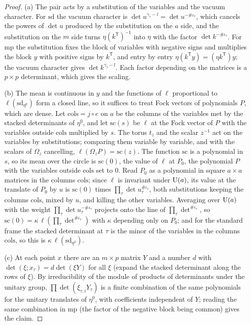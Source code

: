 \begin{proof}
(a) The pair acts by a substitution of the variables and the vacuum character. For $\mathrm{sd}$ the vacuum character is $\det u^{\gamma_\tau-l}=\det u^{-\#\iota_\tau}$, which cancels the powers of $\det u$ produced by the
substitution on the $a$ side, and the substitution on the $m$ side turns $\eta(k^{\mathsf T})^{-1}$ into $\eta$ with the factor $\det k^{-\#\iota_\tau}$. For $\mathrm{mp}$ the substitution fixes the block of variables with
negative signs and multiplies the block $y$ with positive signs by $k^{\mathsf T}$, and entry by entry $\eta(k^{\mathsf T}y)=(\eta k^{\mathsf T})y$; the vacuum character gives $\det k^{\gamma_\tau-l}$. Each factor depending on
the matrices is a $p\times p$ determinant, which gives the scaling.

(b) The mean is continuous in $y$ and the functions of $\ell$ proportional to $\ell(\mathrm{sd}_{\eta^0})$ form a closed line, so it suffices to treat Fock vectors of polynomials $P$, which are dense. Let
$\mathrm{cols}=j\circ e$ on $a$ be the columns of the variables met by the stacked determinants of $\eta^0$, and let $\mathrm{sc}(s)$ be $\ell$ at the Fock vector of $P$ with the variables outside $\mathrm{cols}$ multiplied by
$s$. The torus $t_z$ and the scalar $z^{-1}$ act on the variables by substitutions; comparing them variable by variable, and with the scalars of $\Omega_z$ cancelling, $\ell(\Omega_zP)=\mathrm{sc}(z)$. The function $\mathrm{sc}$
is a polynomial in $s$, so its mean over the circle is $\mathrm{sc}(0)$, the value of $\ell$ at $P_0$, the polynomial $P$ with the variables outside $\mathrm{cols}$ set to $0$. Read $P_0$ as a polynomial in square
$a\times a$ matrices in the columns $\mathrm{cols}$; since $\ell$ is invariant under $\operatorname{U}(a)$, its value at the translate of $P_0$ by $u$ is $\mathrm{sc}(0)$ times $\prod_\tau\det u_\tau^{\#\iota_\tau}$, both substitutions keeping the
columns $\mathrm{cols}$, mixed by $u$, and killing the other variables. Averaging over $\operatorname{U}(a)$ with the weight $\prod_\tau\det u_\tau^{-\#\iota_\tau}$ projects onto the line of $\prod_\tau\det^{\#\iota_\tau}$, so
$\mathrm{sc}(0)=\kappa\,\ell(\prod_\tau\det^{\#\iota_\tau})$ with $\kappa$ depending only on $P_0$; and for the standard frame the stacked determinant at $\tau$ is the minor of the variables in the columns $\mathrm{cols}$, so this is
$\kappa\,\ell(\mathrm{sd}_{\eta^0})$.

(c) At each point $x$ there are an $m\times p$ matrix $Y$ and a number $d$ with $\det(\xi;x_\tau)=d\det(\xi Y)$ for all $\xi$ (expand the stacked determinant along the rows of $\xi$). By irreducibility of the module of
products of determinants under the unitary group, $\prod\det(\xi_{\tau,i}Y_\tau)$ is a finite combination of the same polynomials for the unitary translates of $\eta^0$, with coefficients independent of $Y$; reading
the same combination in $\mathrm{mp}$ (the factor of the negative block being common) gives the claim.
\end{proof}

